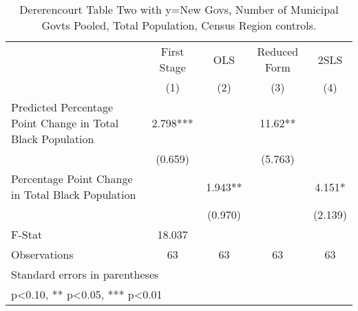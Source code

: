 \begin{table}[htbp]\centering
\def\sym#1{\ifmmode^{#1}\else\(^{#1}\)\fi}
\caption{Dererencourt Table Two with y=New Govs, Number of Municipal Govts  Pooled, Total Population, Census Region controls.}
\begin{tabular}{l*{4}{c}}
\toprule
                    & First Stage   &         OLS   &Reduced Form   &        2SLS   \\
                    &\multicolumn{1}{c}{(1)}   &\multicolumn{1}{c}{(2)}   &\multicolumn{1}{c}{(3)}   &\multicolumn{1}{c}{(4)}   \\
\midrule
Predicted Percentage Point Change in Total Black Population&       2.798***&               &       11.62** &               \\
                    &     (0.659)   &               &     (5.763)   &               \\
\addlinespace
Percentage Point Change in Total Black Population&               &       1.943** &               &       4.151*  \\
                    &               &     (0.970)   &               &     (2.139)   \\
\midrule
F-Stat              &      18.037   &               &               &               \\
Observations        &          63   &          63   &          63   &          63   \\
\bottomrule
\multicolumn{5}{l}{\footnotesize Standard errors in parentheses}\\
\multicolumn{5}{l}{\footnotesize * p<0.10, ** p<0.05, *** p<0.01}\\
\end{tabular}
\end{table}
